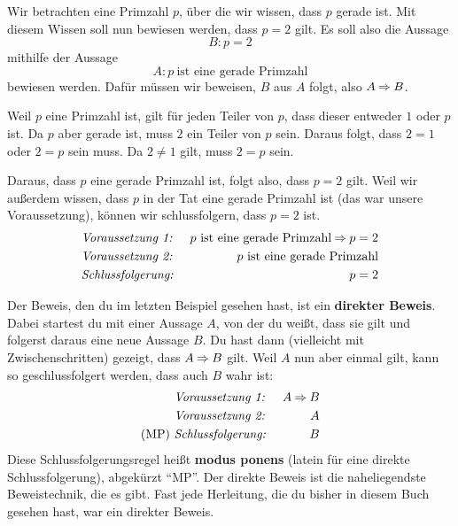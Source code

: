 \documentclass[../../main.tex]{subfiles}
\begin{document}
\begin{example}{}
    Wir betrachten eine Primzahl $p$, über die wir wissen, dass $p$ gerade ist. Mit diesem Wissen soll nun bewiesen werden, dass $p=2$ gilt. Es soll also die Aussage
    \[B:p=2\]
    mithilfe der Aussage
    \[A:p~\text{ist~eine~gerade~Primzahl}\]
    bewiesen werden. Dafür müssen wir beweisen, $B$ aus $A$ folgt, also $A\mathbin{\Rightarrow} B$.

    Weil $p$ eine Primzahl ist, gilt für jeden Teiler von $p$, dass dieser entweder $1$ oder $p$ ist. Da $p$ aber gerade ist, muss $2$ ein Teiler von $p$ sein. Daraus folgt, dass $2=1$ oder $2=p$ sein muss. Da $2\neq 1$ gilt, muss $2=p$ sein.

    Daraus, dass $p$ eine gerade Primzahl ist, folgt also, dass $p=2$ gilt. Weil wir außerdem wissen, dass $p$ in der Tat eine gerade Primzahl ist (das war unsere Voraussetzung), können wir schlussfolgern, dass $p=2$ ist.
    \begin{align*}
        &\text{\emph{Voraussetzung~1:}}~&p~\text{ist~eine~gerade~Primzahl} \mathbin{\Rightarrow} p=2\\
        &\text{\emph{Voraussetzung~2:}}~&p~\text{ist~eine~gerade~Primzahl}\\
        &\text{\emph{Schlussfolgerung:}}~&p=2
    \end{align*}
\end{example}

Der Beweis, den du im letzten Beispiel gesehen hast, ist ein \textbf{direkter Beweis}. Dabei startest du mit einer Aussage $A$, von der du weißt, dass sie gilt und folgerst daraus eine neue Aussage $B$. Du hast dann (vielleicht mit Zwischenschritten) gezeigt, dass $A \mathbin{\Rightarrow} B$ gilt. Weil $A$ nun aber einmal gilt, kann so geschlussfolgert werden, dass auch $B$ wahr ist:
\begin{align*}
    &\text{\emph{Voraussetzung~1:}}~&A \mathbin{\Rightarrow} B\\
    &\text{\emph{Voraussetzung~2:}}~&A\\
    (\text{MP})~&\text{\emph{Schlussfolgerung:}}~&B
\end{align*}
Diese Schlussfolgerungsregel heißt \textbf{modus ponens} (latein für eine direkte Schlussfolgerung), abgekürzt \enquote{MP}. Der direkte Beweis ist die naheliegendste Beweistechnik, die es gibt. Fast jede Herleitung, die du bisher in diesem Buch gesehen hast, war ein direkter Beweis.
\end{document}
